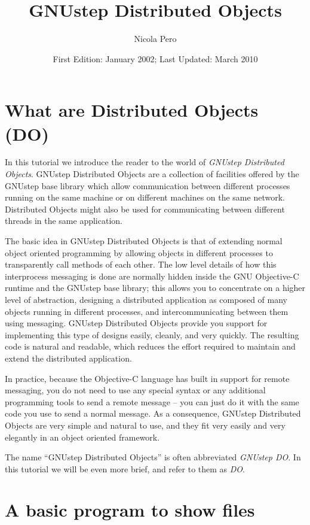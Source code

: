 \documentclass[a4paper]{article}
\begin{document}
\author{Nicola Pero}
\title{GNUstep Distributed Objects}
\date{First Edition: January 2002; Last Updated: March 2010}
\maketitle

\section{What are Distributed Objects (DO)}

In this tutorial we introduce the reader to the world of {\it GNUstep
  Distributed Objects}.  GNUstep Distributed Objects are a collection
of facilities offered by the GNUstep base library which allow
communication between different processes running on the same machine
or on different machines on the same network.  Distributed Objects
might also be used for communicating between different threads in the
same application.

The basic idea in GNUstep Distributed Objects is that of extending
normal object oriented programming by allowing objects in different
processes to transparently call methods of each other.  The low level
details of how this interprocess messaging is done are normally hidden
inside the GNU Objective-C runtime and the GNUstep base library; this
allows you to concentrate on a higher level of abstraction, designing
a distributed application as composed of many objects running in
different processes, and intercommunicating between them using
messaging.  GNUstep Distributed Objects provide you support for
implementing this type of designs easily, cleanly, and very quickly.
The resulting code is natural and readable, which reduces the effort
required to maintain and extend the distributed application.

In practice, because the Objective-C language has built in support for
remote messaging, you do not need to use any special syntax or any
additional programming tools to send a remote message -- you can just
do it with the same code you use to send a normal message.  As a
consequence, GNUstep Distributed Objects are very simple and natural
to use, and they fit very easily and very elegantly in an object
oriented framework.

The name ``GNUstep Distributed Objects'' is often abbreviated {\it
  GNUstep DO}.  In this tutorial we will be even more brief, and refer
to them as {\it DO}.


\section{A basic program to show files}
\end{document}
